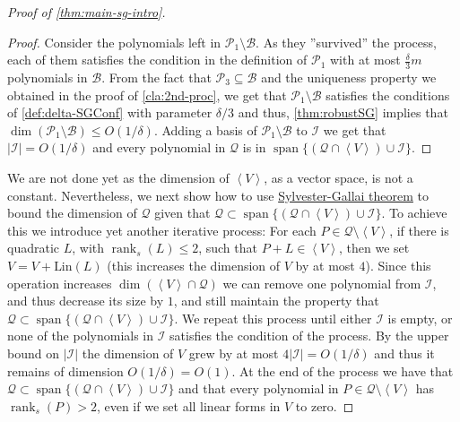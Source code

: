 \documentclass[10pt,a4paper]{article}
\def\rank{\operatorname{rank}}
\newcommand{\cB}{{\mathcal{B}}}
\newcommand{\cI}{{\mathcal{I}}}
\newcommand{\cQ}{{\mathcal{Q}}}
\newcommand{\calP}{{\mathcal{P}}}
\newcommand{\ideal}[1]{\left \langle{#1}\right \rangle}
\newcommand{\spn}[1]{\operatorname{span}\{{#1}\}}
\newcommand{\MS}{\text{Lin}}
\begin{document}
\begin{proof}[Proof of \autoref{thm:main-sg-intro}]
\begin{proof}
Consider the polynomials left in $\calP_1\setminus \cB$. As they ''survived'' the process, each of them satisfies the condition in the definition of $\calP_1$  with at most $\frac{\delta}{3}m$ polynomials in $\cB$. From the fact that $\calP_3\subseteq \cB$ and  the uniqueness property we obtained in the proof of \autoref{cla:2nd-proc}, we get that $\calP_1\setminus \cB$ satisfies the conditions of \autoref{def:delta-SGConf} with parameter $\delta/3$ and thus, \autoref{thm:robustSG} implies that $\dim(\calP_1\setminus \cB)\leq O(1/\delta)$. Adding a basis of $\calP_1\setminus \cB$ to $\cI$ we get that $|\cI| = O(1/\delta)$ and every polynomial in $\cQ$ is in $\spn{(\cQ\cap \ideal{V})\cup \cI}$.
\end{proof}


 
We are not done yet as the dimension of $\ideal{V}$, as a vector space, is not a constant.  Nevertheless, we next show how to use \hyperref[thm:SG-linforms]{Sylvester-Gallai theorem} to bound the dimension of $\cQ$ given that  $\cQ \subset \spn{(\cQ\cap \ideal{V})\cup \cI}$. To achieve this we introduce yet another iterative process:  For each $P\in \cQ\setminus \ideal{V}$, if there is quadratic $L$, with $\rank_s(L) \leq 2$, such that  $P + L \in \ideal{V}$, then we set $V = V+\MS(L)$ (this increases the dimension of $V$ by at most $4$). Since this operation increases $\dim\left( \ideal{V}\cap \cQ \right)$ we can remove one polynomial from $\cI$, and thus decrease its size by $1$, and still maintain the property that $\cQ \subset \spn{(\cQ\cap \ideal{V})\cup \cI}$. We repeat this process until either $\cI$ is empty, or none of the polynomials in $\cI$ satisfies the condition of the process. By the upper bound on $|\cI|$ the dimension of $V$ grew by at most  $4|\cI|= O( 1/{\delta})$ and thus it remains of dimension $O( 1/{\delta})=O(1)$. 
At the end of the process we have that $\cQ \subset \spn{(\cQ\cap \ideal{V})\cup \cI}$
and that every polynomial in $P \in \cQ\setminus \ideal{V}$ has $\rank_s(P) > 2$, even if we set all linear forms in $V$ to zero. 


\end{proof}
\end{document}
